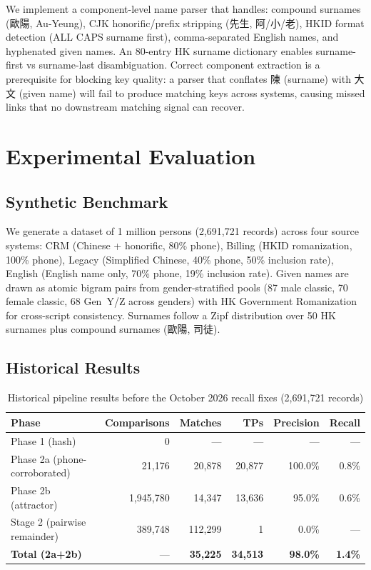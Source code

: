 \documentclass{article}
\begin{document}
We implement a component-level name parser that handles: compound surnames (歐陽, Au-Yeung), CJK honorific/prefix stripping (先生, 阿/小/老), HKID format detection (ALL CAPS surname first), comma-separated English names, and hyphenated given names. An 80-entry HK surname dictionary enables surname-first vs surname-last disambiguation. Correct component extraction is a prerequisite for blocking key quality: a parser that conflates 陳 (surname) with 大文 (given name) will fail to produce matching keys across systems, causing missed links that no downstream matching signal can recover.

\section{Experimental Evaluation}\label{sec:experiments}

\subsection{Synthetic Benchmark}

We generate a dataset of 1 million persons (2,691,721 records) across four source systems: CRM (Chinese + honorific, 80\% phone), Billing (HKID romanization, 100\% phone), Legacy (Simplified Chinese, 40\% phone, 50\% inclusion rate), English (English name only, 70\% phone, 19\% inclusion rate). Given names are drawn as atomic bigram pairs from gender-stratified pools (87 male classic, 70 female classic, 68 Gen~Y/Z across genders) with HK Government Romanization for cross-script consistency. Surnames follow a Zipf distribution over 50 HK surnames plus compound surnames (歐陽, 司徒).

\subsection{Historical Results}

\begin{table}[h]
\centering
\caption{Historical pipeline results before the October 2026 recall fixes (2,691,721 records)}\label{tab:results}
\begin{tabular}{lrrrrr}
\toprule
Phase & Comparisons & Matches & TPs & Precision & Recall \\
\midrule
Phase 1 (hash) & 0 & — & — & — & — \\
Phase 2a (phone-corroborated) & 21,176 & 20,878 & 20,877 & 100.0\% & 0.8\% \\
Phase 2b (attractor) & 1,945,780 & 14,347 & 13,636 & 95.0\% & 0.6\% \\
Stage 2 (pairwise remainder) & 389,748 & 112,299 & 1 & 0.0\% & — \\
\midrule
\textbf{Total (2a+2b)} & — & \textbf{35,225} & \textbf{34,513} & \textbf{98.0\%} & \textbf{1.4\%} \\
\bottomrule
\end{tabular}
\end{table}
\end{document}
